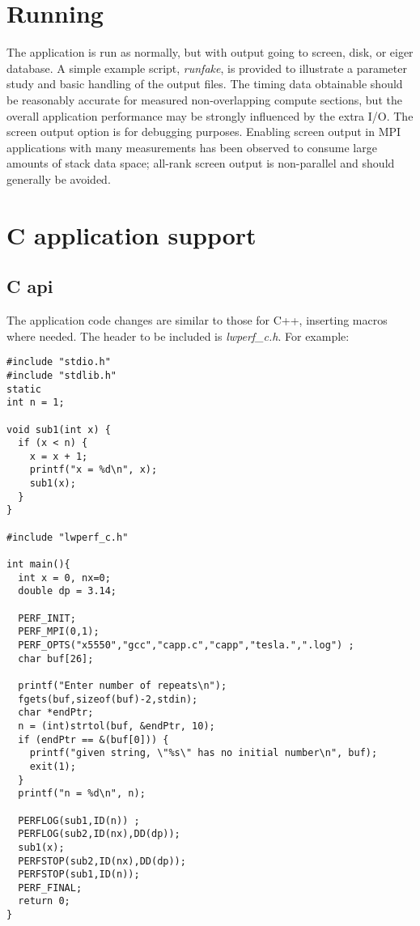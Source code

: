 \documentclass{article}
\begin{document}
\section{Running}
\label{sec:running}
The application is run as normally, but with output going to screen, disk, or eiger database. A simple example script, {\em runfake}, is provided to illustrate a parameter study and basic handling of the output files.
The timing data obtainable should be reasonably accurate for measured non-overlapping compute sections, but the overall application performance may be strongly influenced by the extra I/O.
The screen output option is for debugging purposes.
Enabling screen output in MPI applications with many measurements has been observed to consume large amounts of stack data space; all-rank screen output is non-parallel and should generally be avoided. 

\section{C application support}
\label{sec:langC}

\subsection{C api}
\label{sec:capi}
The application code changes are similar to those for C++, inserting macros where needed. The header to be included is {\em lwperf\_c.h}. For example:
\begin{verbatim}
#include "stdio.h"
#include "stdlib.h"
static
int n = 1;

void sub1(int x) {
  if (x < n) {
    x = x + 1;
    printf("x = %d\n", x);
    sub1(x);
  }
}

#include "lwperf_c.h"

int main(){
  int x = 0, nx=0;
  double dp = 3.14;

  PERF_INIT;
  PERF_MPI(0,1);
  PERF_OPTS("x5550","gcc","capp.c","capp","tesla.",".log") ;
  char buf[26];

  printf("Enter number of repeats\n");
  fgets(buf,sizeof(buf)-2,stdin);
  char *endPtr;
  n = (int)strtol(buf, &endPtr, 10);
  if (endPtr == &(buf[0])) {
    printf("given string, \"%s\" has no initial number\n", buf);
    exit(1);
  }
  printf("n = %d\n", n);

  PERFLOG(sub1,ID(n)) ;
  PERFLOG(sub2,ID(nx),DD(dp));
  sub1(x);
  PERFSTOP(sub2,ID(nx),DD(dp));
  PERFSTOP(sub1,ID(n));
  PERF_FINAL;
  return 0;
}
\end{verbatim}
\end{document}
